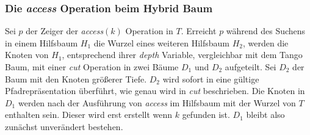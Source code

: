 \documentclass[a4paper,12pt]{article}
\begin{document}
 \subsubsection{Die \textit{access} Operation beim Hybrid Baum}
Sei $p$ der Zeiger der \textit{access}$\left(k\right)$ Operation in $T$. Erreicht $p$ während des Suchens in einem Hilfsbaum $H_1$ die Wurzel eines weiteren Hilfsbaum $H_2$, werden die Knoten von $H_1$, entsprechend ihrer \textit{depth} Variable, vergleichbar mit dem Tango Baum,  mit einer \textit{cut} Operation in zwei Bäume $D_1$ und $D_2$ aufgeteilt. Sei $D_2$ der Baum mit den Knoten größerer Tiefe. $D_2$ wird sofort in eine gültige Pfadrepräsentation überführt, wie genau wird in \textit{cut} beschrieben. Die Knoten in $D_1$ werden nach der Ausführung von \textit{access} im Hilfsbaum mit der Wurzel von $T$ enthalten sein. Dieser wird erst erstellt wenn $k$ gefunden ist. $D_1$ bleibt also zunächst unverändert bestehen.       
\end{document}
